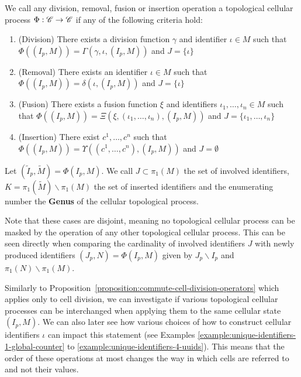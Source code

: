 \begin{definition}
    We call any division, removal, fusion or insertion operation a
    topological cellular process $\Phi:\mathscr{C}\rightarrow\mathscr{C}$ if any of the following criteria hold:
    \begin{enumerate}
        \item (Division) There exists a division function $\gamma$ and identifier $\iota\in M$ such
            that $\Phi((I_p,M)) = \Gamma(\gamma,\iota,(I_p,M))$ and $J=\{\iota\}$
        \item (Removal) There exists an identifier $\iota\in M$ such that
            $\Phi((I_p,M))=\delta(\iota,(I_p,M))$ and $J=\{\iota\}$
        \item (Fusion) There exists a fusion function $\xi$ and identifiers
            $\iota_1,\dots,\iota_n\in M$ such that
            $\Phi((I_p,M))=\Xi(\xi,(\iota_1,\dots,\iota_n),(I_p,M))$ and $J=\{\iota_1,\dots,\iota_n\}$
        \item (Insertion) There exist $c^1,\dots,c^n$ such that
            $\Phi((I_p,M))=\Upsilon((c^1,\dots,c^n),(I_p,M))$ and $J=\emptyset$
    \end{enumerate}
    Let $(\tilde{I}_p,\tilde{M})=\Phi(I_p,M)$.
    We call $J\subset\pi_1(M)$ the set of involved identifiers,
    $K=\pi_1(\tilde{M})\backslash\pi_1(M)$ the set of inserted identifiers and the enumerating
    number the \textbf{Genus} of the cellular topological process.
    \label{definition:topological-cellular-process}
\end{definition}

Note that these cases are disjoint, meaning no topological cellular process can be masked by the
operation of any other topological cellular process.
This can be seen directly when comparing the cardinality of involved identifiers $J$ with newly
produced identifiers $(J_p,N)=\Phi(I_p,M)$ given by $J_p\backslash I_p$ and
$\pi_1(N)\backslash\pi_1(M)$.

Similarly to Proposition~\ref{proposition:commute-cell-division-operators} which applies only to
cell division, we can investigate if various topological cellular processes can be interchanged
when applying them to the same cellular state $(I_p,M)$.
We can also later see how various choices of how to construct cellular identifiers $\iota$ can
impact this statement (see Examples \ref{example:unique-identifiers-1-global-counter} to
\ref{example:unique-identifiers-4-uuids}).
This means that the order of these operations at most changes the way in which cells are referred
to and not their values.

